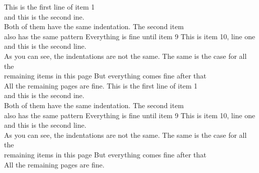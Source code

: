 \documentclass[xcolor={dvipsnames,table},11pt]{beamer}
\begin{document}
\begin{frame}[allowframebreaks]
\begin{thebibliography}{}
\bibitem{} This is the first line of item 1\\ and this is the second ine. \\ Both of them have the same indentation.
\bibitem{} The second item \\ also has the same pattern
\bibitem{} Everything is fine until item 9
\bibitem{} This is item 10, line one\\ and this is the second line.\\ As you can see, the indentations are not the same.
\bibitem{} The same is the case for all the \\remaining items in this page
\bibitem{} But everything comes fine after that\\ All the remaining pages are fine.
\bibitem{} This is the first line of item 1\\ and this is the second ine. \\ Both of them have the same indentation.
\bibitem{} The second item \\ also has the same pattern
\bibitem{} Everything is fine until item 9
\bibitem{} This is item 10, line one\\ and this is the second line.\\ As you can see, the indentations are not the same.
\bibitem{} The same is the case for all the \\remaining items in this page
\bibitem{} But everything comes fine after that\\ All the remaining pages are fine.
\end{thebibliography}
\end{frame}
\end{document}
